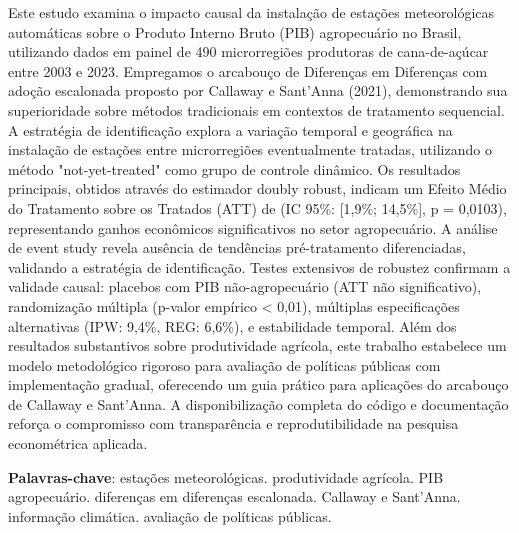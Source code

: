 \documentclass[
	12pt,				%
	oneside,			%
	a4paper,			%
	english,			%
	french,				%
	spanish,			%
	brazil				%
	]{abntex2}
\begin{document}
\setlength{\absparsep}{18pt} %
\begin{resumo}
Este estudo examina o impacto causal da instalação de estações meteorológicas automáticas sobre o Produto Interno Bruto (PIB) agropecuário no Brasil, utilizando dados em painel de 490 microrregiões produtoras de cana-de-açúcar entre 2003 e 2023. Empregamos o arcabouço de Diferenças em Diferenças com adoção escalonada proposto por Callaway e Sant'Anna (2021), demonstrando sua superioridade sobre métodos tradicionais em contextos de tratamento sequencial. A estratégia de identificação explora a variação temporal e geográfica na instalação de estações entre microrregiões eventualmente tratadas, utilizando o método "not-yet-treated" como grupo de controle dinâmico. Os resultados principais, obtidos através do estimador doubly robust, indicam um Efeito Médio do Tratamento sobre os Tratados (ATT) de \mainattpct{} (IC 95\%: [1,9\%; 14,5\%], p = 0,0103), representando ganhos econômicos significativos no setor agropecuário. A análise de event study revela ausência de tendências pré-tratamento diferenciadas, validando a estratégia de identificação. Testes extensivos de robustez confirmam a validade causal: placebos com PIB não-agropecuário (ATT não significativo), randomização múltipla (p-valor empírico < 0,01), múltiplas especificações alternativas (IPW: 9,4\%, REG: 6,6\%), e estabilidade temporal. Além dos resultados substantivos sobre produtividade agrícola, este trabalho estabelece um modelo metodológico rigoroso para avaliação de políticas públicas com implementação gradual, oferecendo um guia prático para aplicações do arcabouço de Callaway e Sant'Anna. A disponibilização completa do código e documentação reforça o compromisso com transparência e reprodutibilidade na pesquisa econométrica aplicada.

 \textbf{Palavras-chave}: estações meteorológicas. produtividade agrícola. PIB agropecuário. diferenças em diferenças escalonada. Callaway e Sant'Anna. informação climática. avaliação de políticas públicas.
\end{resumo}
\end{document}
